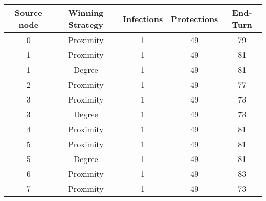 \documentclass[results.tex]{subfiles}
\begin{document}
    \begin{center}
        \begin{tabular}{| c || c | c | c | c |}
            \hline
            {\bfseries Source node} & {\bfseries Winning Strategy} & {\bfseries Infections} & {\bfseries Protections}
            & {\bfseries End-Turn}
            \\  %
            \hline\hline
            0                       & Proximity                    & 1                      & 49                      & 79                   \\
            \hline
            1                       & Proximity                    & 1                      & 49                      & 81                   \\
            \hline
            1                       & Degree                       & 1                      & 49                      & 81                   \\
            \hline
            2                       & Proximity                    & 1                      & 49                      & 77                   \\
            \hline
            3                       & Proximity                    & 1                      & 49                      & 73                   \\
            \hline
            3                       & Degree                       & 1                      & 49                      & 73                   \\
            \hline
            4                       & Proximity                    & 1                      & 49                      & 81                   \\
            \hline
            5                       & Proximity                    & 1                      & 49                      & 81                   \\
            \hline
            5                       & Degree                       & 1                      & 49                      & 81                   \\
            \hline
            6                       & Proximity                    & 1                      & 49                      & 83                   \\
            \hline
            7                       & Proximity                    & 1                      & 49                      & 73                   \\

\end{tabular}
\end{center}
\end{document}
